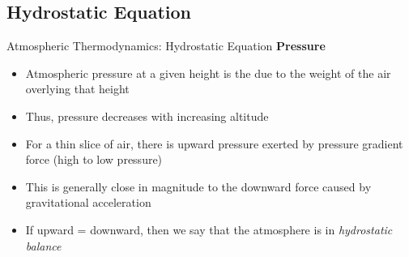 \subsection{Hydrostatic Equation}
\begin{frame}{Atmospheric Thermodynamics: Hydrostatic Equation}
\textbf{Pressure}
\begin{itemize}
	\item Atmospheric pressure at a given height is the due to the weight of the air overlying that height
	\item Thus, pressure decreases with increasing altitude
	\item For a thin slice of air, there is upward pressure exerted by pressure gradient force (high to low pressure)
	\item This is generally close in magnitude to the downward force caused by gravitational acceleration
	\item If upward = downward, then we say that the atmosphere is in \textit{hydrostatic balance}
	\end{itemize}
\end{frame}
